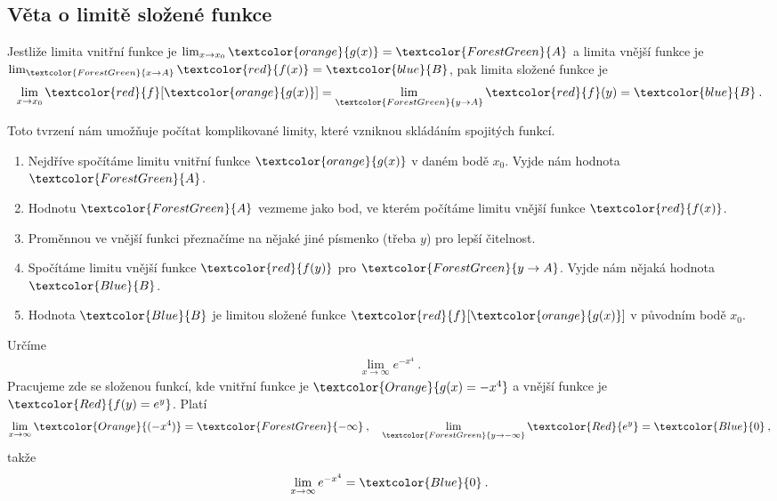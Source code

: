 \subsection*{Věta o limitě složené funkce}

Jestliže limita vnitřní funkce je $\lim_{x \rightarrow x_0} \textcolor{orange}{g(x)} = \textcolor{ForestGreen}{A}$ a limita vnější funkce je $\lim_{\textcolor{ForestGreen}{x \rightarrow  A}} \textcolor{red}{f(x)} = \textcolor{blue}{B}$, pak limita složené funkce je
\begin{align}
    \lim_{x \rightarrow x_0} \textcolor{red}{f}[\textcolor{orange}{g(x)}] =  \lim_{\textcolor{ForestGreen}{y \rightarrow A}} \textcolor{red}{f}(y) = \textcolor{blue}{B} \:.
\end{align}

Toto tvrzení nám umožňuje počítat komplikované limity, které vzniknou skládáním spojitých funkcí.
\begin{enumerate}
    \item Nejdříve spočítáme limitu vnitřní funkce $\textcolor{orange}{g(x)}$ v daném bodě $x_0$. Vyjde nám hodnota $\textcolor{ForestGreen}{A}$.
    \item Hodnotu $\textcolor{ForestGreen}{A}$ vezmeme jako bod, ve kterém počítáme limitu vnější funkce $\textcolor{red}{f(x)}$.
    \item Proměnnou ve vnější funkci přeznačíme na nějaké jiné písmenko (třeba $y$) pro lepší čitelnost.
    \item Spočítáme limitu vnější funkce $\textcolor{red}{f(y)}$ pro $\textcolor{ForestGreen}{y \rightarrow A}$. Vyjde nám nějaká hodnota $\textcolor{Blue}{B}$.
    \item Hodnota $\textcolor{Blue}{B}$ je limitou složené funkce $\textcolor{red}{f}[\textcolor{orange}{g(x)}]$ v původním bodě $x_0$.
\end{enumerate}

\begin{example}
    Určíme
    \begin{align}
        \lim_{x \rightarrow \infty} e^{-x^4} \:.
    \end{align}
    Pracujeme zde se složenou funkcí, kde vnitřní funkce je $\textcolor{Orange}{g(x) = -x^4}$ a vnější funkce je $\textcolor{Red}{f(y) = e^y}$. Platí
    \begin{align}
        \lim_{x \rightarrow \infty} \textcolor{Orange}{(-x^4)} = \textcolor{ForestGreen}{- \infty }\:, \quad \lim_{\textcolor{ForestGreen}{y \rightarrow - \infty}} \textcolor{Red}{e^{y}} = \textcolor{Blue}{0} \:, 
    \end{align}
    takže
    \begin{align}
        \lim_{x \rightarrow \infty} e^{-x^4} = \textcolor{Blue}{0} \:.
    \end{align}
\end{example}


